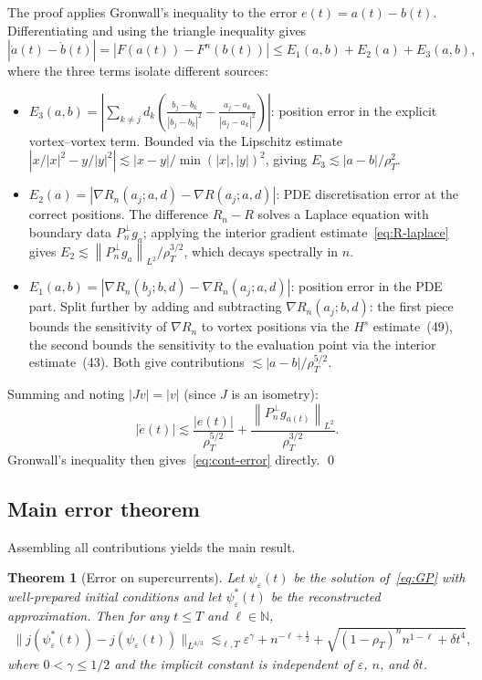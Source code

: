 \documentclass[12pt, a4paper]{article}
\theoremstyle{plain}
\newtheorem{theorem}{Theorem}[section]
\theoremstyle{definition}
\newcommand{\N}{\mathbb{N}}
\newcommand{\psieps}{\psi_\varepsilon}
\newcommand{\psistar}{\psi^*_\varepsilon}
\newcommand{\norm}[1]{\left\lVert #1 \right\rVert}
\newcommand{\abs}[1]{\left\lvert #1 \right\rvert}
\begin{document}
The proof applies Gronwall's inequality to the error $e(t) = a(t) - b(t)$.
Differentiating and using the triangle inequality gives
\[
  \abs{\dot a(t) - \dot b(t)}
  = \abs{F(a(t)) - F^n(b(t))}
  \le E_1(a,b) + E_2(a) + E_3(a,b),
\]
where the three terms isolate different sources:
\begin{itemize}
  \item $E_3(a,b) = \abs{\sum_{k\ne j} d_k\!\left(\frac{b_j-b_k}{\abs{b_j-b_k}^2}
        - \frac{a_j-a_k}{\abs{a_j-a_k}^2}\right)}$:
        position error in the explicit vortex--vortex term.
        Bounded via the Lipschitz estimate
        $\abs{x/\abs{x}^2 - y/\abs{y}^2} \lesssim \abs{x-y}/\min(\abs{x},\abs{y})^2$,
        giving $E_3 \lesssim \abs{a-b}/\rho_T^2$.

  \item $E_2(a) = \abs{\nabla R_n(a_j; a,d) - \nabla R(a_j; a,d)}$:
        PDE discretisation error at the correct positions.
        The difference $R_n - R$ solves a Laplace equation with boundary data
        $P_n^\perp g_a$; applying the interior gradient estimate~\eqref{eq:R-laplace}
        gives $E_2 \lesssim \norm{P_n^\perp g_a}_{L^2}/ \rho_T^{3/2}$,
        which decays spectrally in $n$.

  \item $E_1(a,b) = \abs{\nabla R_n(b_j; b,d) - \nabla R_n(a_j; a,d)}$:
        position error in the PDE part.
        Split further by adding and subtracting $\nabla R_n(a_j; b,d)$:
        the first piece bounds the sensitivity of $\nabla R_n$ to vortex
        positions via the $H^s$ estimate~(49), the second bounds the
        sensitivity to the evaluation point via the interior estimate~(43).
        Both give contributions $\lesssim \abs{a-b}/\rho_T^{5/2}$.
\end{itemize}
Summing and noting $|Jv| = |v|$ (since $J$ is an isometry):
\[
  \abs{\dot e(t)} \lesssim \frac{\abs{e(t)}}{\rho_T^{5/2}}
  + \frac{\norm{P_n^\perp g_{a(t)}}_{L^2}}{\rho_T^{3/2}}.
\]
Gronwall's inequality then gives~\eqref{eq:cont-error} directly. \qed

\subsection{Main error theorem}

Assembling all contributions yields the main result.

\begin{theorem}[Error on supercurrents]
  \label{thm:main-error}
  Let $\psieps(t)$ be the solution of~\eqref{eq:GP} with well-prepared
  initial conditions and let $\psistar(t)$ be the reconstructed approximation.
  Then for any $t \le T$ and $\ell \in \N$,
  \begin{align}
    \bigl\|j(\psistar(t)) - j(\psieps(t))\bigr\|_{L^{4/3}}
    \lesssim_{\ell,T}
    \varepsilon^\gamma
    + n^{-\ell + \frac{1}{2}}
    + \sqrt{(1-\rho_T)^n n^{1-\ell} + \delta t^4},
    \label{eq:main-error}
  \end{align}
  where $0 < \gamma \le 1/2$ and the implicit constant is independent
  of $\varepsilon$, $n$, and $\delta t$.
\end{theorem}
\end{document}
